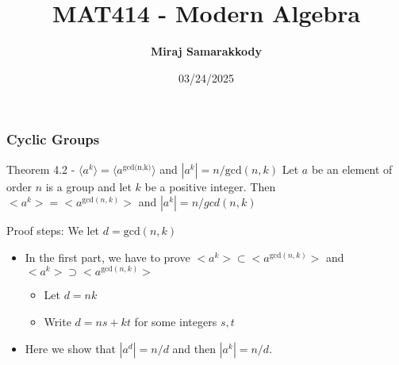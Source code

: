 \documentclass{beamer}
\title{MAT414 - Modern Algebra}
\author{\textbf{Miraj Samarakkody}}
\institute{Tougaloo College}
\date{03/24/2025}
\begin{document}
\begin{frame}
    \titlepage
\end{frame}

\begin{frame}
    \frametitle{Cyclic Groups}

    \begin{block}{Theorem 4.2 - \(\langle a^k \rangle= \langle a^{\text{gcd(n,k)}}\rangle\) and \(|a^k|=n/ \text{gcd}(n,k)\)}
        Let \(a\) be an element of order \(n\) is a group and let \(k\) be a positive integer. Then \(<a^k>=<a^{\text{gcd}(n,k)}>\) and \(|a^k|=n/gcd(n,k)\)
    \end{block}\pause 
    \begin{block}{Proof steps:}
        We let \(d=\text{gcd}(n,k)\)
        \begin{itemize}
            \item In the first part, we have to prove \(<a^k> \subset <a^{\text{gcd}(n,k)}>\) and \(<a^k>\supset <a^{\text{gcd}(n,k)}>\)\pause
            \begin{itemize}
                \item Let \(d=nk\)\pause
                \item Write \(d=ns+kt\) for some integers \(s,t \)\pause
            \end{itemize} 
            \item Here we show that \(|a^d|= n/d\) and then \(|a^k| =n/d\). 
        \end{itemize}
        
    \end{block}
\end{frame}

    
\end{document}
